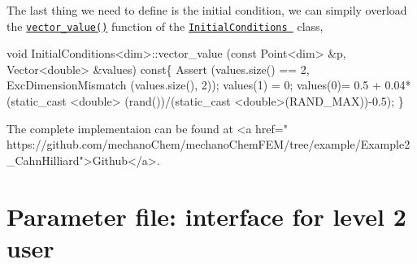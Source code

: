 The last thing we need to define is the initial condition, we can simpily overload the \href{../html/class_initial_conditions.html#aa10cfdd7350c3810a8deab707f397657}{\tt vector\-\_\-value()} function of the \href{../html/class_initial_conditions.html}{\tt Initial\-Conditions } class, 
\begin{DoxyCode}
\textcolor{keywordtype}{void} InitialConditions<dim>::vector_value (\textcolor{keyword}{const} Point<dim>   &p, Vector<double>   &values)\textcolor{keyword}{ const}\{
  Assert (values.size() == 2, ExcDimensionMismatch (values.size(), 2));
  values(1) = 0;    
 values(0)= 0.5 + 0.04*(static\_cast <\textcolor{keywordtype}{double}> (rand())/(static\_cast <double>(RAND\_MAX))-0.5);
\}

  The complete implementaion can be found at  <a href=\textcolor{stringliteral}{"
      https://github.com/mechanoChem/mechanoChemFEM/tree/example/Example2\_CahnHilliard"}>Github</a>. 
\end{DoxyCode}
\hypertarget{growth_file}{}\section{Parameter file\-: interface for level 2 user}\label{growth_file}

